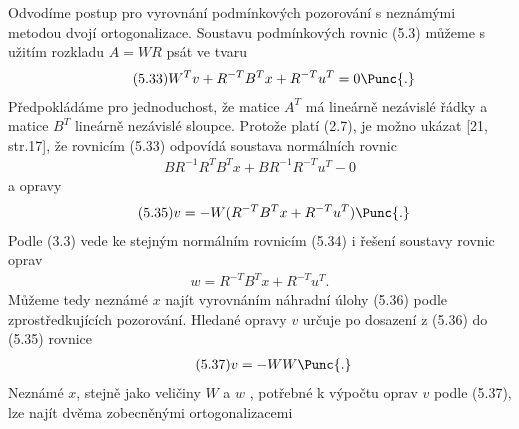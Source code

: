  \label{XLVIII} Odvodíme postup pro vyrovnání podmínkových
pozorování s neznámými metodou dvojí ortogonalizace. Soustavu
podmínkových rovnic (5.3) můžeme s užitím rozkladu
$A = WR$ psát ve tvaru
%
\begin{align*}
\tag{5.33}     W^Tv + R^{-T}B^Tx + R^{-T}u^T = 0 \Punc{.}
\end{align*}
%
Předpokládáme pro jednoduchost, že matice $A^T$ má lineárně nezávislé
řádky a matice $B^T$ lineárně nezávislé sloupce. Protože platí (2.7),
je možno ukázat [21, str.17], že rovnicím (5.33) odpovídá soustava
normálních rovnic
%
\begin{align*}
\tag{5.34}    BR^{-1}R^TB^Tx + BR^{-1}R^{-T}u^T - 0
\end{align*}
%
a opravy
%
\begin{align*}
\tag{5.35}    v = -W(R^{-T}B^Tx + R^{-T}u^T) \Punc{.}
\end{align*}
%
Podle (3.3) vede ke stejným normálním rovnicím (5.34) i řešení
soustavy rovnic oprav
%
\begin{align*}
\tag{5.36}   w = R^{-T}B^Tx + R^{-T}u^T .
\end{align*}
%
Můžeme tedy neznámé $x$ najít vyrovnáním náhradní úlohy (5.36)
podle zprostředkujících pozorování. Hledané opravy $v$ určuje po
dosazení z (5.36) do (5.35) rovnice
%
\begin{align*}
\tag{5.37}      v = -WW \Punc{.}
\end{align*}
%
Neznámé $x$, stejně jako veličiny $W$ a $w$ , potřebné k výpočtu oprav
$v$ podle (5.37), lze najít dvěma zobecněnými
ortogonalizacemi 
%
